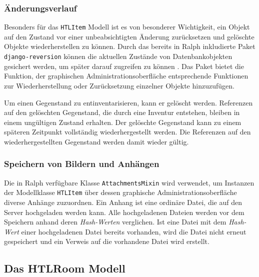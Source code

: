 \hypertarget{uxe4nderungsverlauf}{%
\subsubsection{Änderungsverlauf}\label{uxe4nderungsverlauf}}

Besonders für das \texttt{HTLItem} Modell ist es von besonderer
Wichtigkeit, ein Objekt auf den Zustand vor einer unbeabsichtigten
Änderung zurücksetzen und gelöschte Objekte wiederherstellen zu können.
Durch das bereits in Ralph inkludierte Paket \texttt{django-reversion}
können die aktuellen Zustände von Datenbankobjekten gesichert werden, um
später darauf zugreifen zu können \cite{django-reversion-doku}. Das
Paket bietet die Funktion, der graphischen Administrationsoberfläche
entsprechende Funktionen zur Wiederherstellung oder Zurücksetzung
einzelner Objekte hinzuzufügen.

Um einen Gegenstand zu entinventarisieren, kann er gelöscht werden.
Referenzen auf den gelöschten Gegenstand, die durch eine Inventur
entstehen, bleiben in einem ungültigen Zustand erhalten. Der gelöschte
Gegenstand kann zu einem späteren Zeitpunkt vollständig
wiederhergestellt werden. Die Referenzen auf den wiederhergestellten
Gegenstand werden damit wieder gültig.

\hypertarget{speichern-von-bildern-und-anhuxe4ngen}{%
\subsubsection{Speichern von Bildern und
Anhängen}\label{speichern-von-bildern-und-anhuxe4ngen}}

Die in Ralph verfügbare Klasse \texttt{AttachmentsMixin} wird verwendet,
um Instanzen der Modellklasse \texttt{HTLItem} über dessen graphische
Administrationsoberfläche diverse Anhänge zuzuordnen. Ein Anhang ist
eine ordinäre Datei, die auf den Server hochgeladen werden kann. Alle
hochgeladenen Dateien werden vor dem Speichern anhand deren
\emph{Hash-Werten}
verglichen. Ist eine Datei mit dem
\emph{Hash-Wert}
einer hochgeladenen Datei bereits vorhanden, wird die Datei nicht erneut
gespeichert und ein Verweis auf die vorhandene Datei wird erstellt.

\hypertarget{das-htlroom-modell}{%
\subsection{Das HTLRoom Modell}\label{das-htlroom-modell}}

